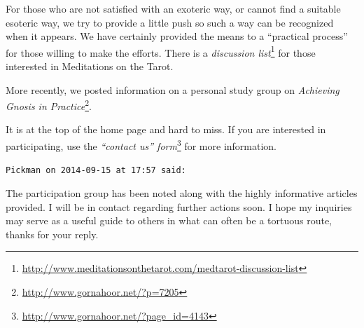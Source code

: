 \begin{footnotesize}
\begin{sffamily}
For those who are not satisfied with an exoteric way, or cannot find a suitable esoteric way, we try to provide a little push so such a way can be recognized when it appears. We have certainly provided the means to a ``practical process'' for those willing to make the efforts. There is a \textit{discussion list}\footnote{\url{http://www.meditationsonthetarot.com/medtarot-discussion-list}} for those interested in Meditations on the Tarot.

More recently, we posted information on a personal study group on \textit{Achieving Gnosis in Practice}\footnote{\url{http://www.gornahoor.net/?p=7205}}.

It is at the top of the home page and hard to miss. If you are interested in participating, use the
\textit{``contact us'' form}\footnote{\url{http://www.gornahoor.net/?page_id=4143}} for more information.

\hfill

\texttt{Pickman on 2014-09-15 at 17:57 said:}

The participation group has been noted along with the highly informative articles provided. I will be in contact regarding further actions soon. I hope my inquiries may serve as a useful guide to others in what can often be a tortuous route, thanks for your reply.


\hfill

\end{sffamily}
\end{footnotesize}

